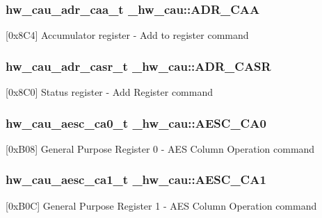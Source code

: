 \subsubsection[{\texorpdfstring{A\+D\+R\+\_\+\+C\+AA}{ADR_CAA}}]{ {\bf hw\+\_\+cau\+\_\+adr\+\_\+caa\+\_\+t} \+\_\+hw\+\_\+cau\+::\+A\+D\+R\+\_\+\+C\+AA}\hypertarget{struct__hw__cau_ad7cd403cbd4fd316a355c388cba84c43}{}\label{struct__hw__cau_ad7cd403cbd4fd316a355c388cba84c43}
\mbox{[}0x8\+C4\mbox{]} Accumulator register -\/ Add to register command 
\subsubsection[{\texorpdfstring{A\+D\+R\+\_\+\+C\+A\+SR}{ADR_CASR}}]{ {\bf hw\+\_\+cau\+\_\+adr\+\_\+casr\+\_\+t} \+\_\+hw\+\_\+cau\+::\+A\+D\+R\+\_\+\+C\+A\+SR}\hypertarget{struct__hw__cau_afc95808d62c7bfecc0e239c5c82dfb86}{}\label{struct__hw__cau_afc95808d62c7bfecc0e239c5c82dfb86}
\mbox{[}0x8\+C0\mbox{]} Status register -\/ Add Register command 
\subsubsection[{\texorpdfstring{A\+E\+S\+C\+\_\+\+C\+A0}{AESC_CA0}}]{ {\bf hw\+\_\+cau\+\_\+aesc\+\_\+ca0\+\_\+t} \+\_\+hw\+\_\+cau\+::\+A\+E\+S\+C\+\_\+\+C\+A0}\hypertarget{struct__hw__cau_af13ff7ad2c8c9054b08d05363509a18a}{}\label{struct__hw__cau_af13ff7ad2c8c9054b08d05363509a18a}
\mbox{[}0x\+B08\mbox{]} General Purpose Register 0 -\/ A\+ES Column Operation command 
\subsubsection[{\texorpdfstring{A\+E\+S\+C\+\_\+\+C\+A1}{AESC_CA1}}]{ {\bf hw\+\_\+cau\+\_\+aesc\+\_\+ca1\+\_\+t} \+\_\+hw\+\_\+cau\+::\+A\+E\+S\+C\+\_\+\+C\+A1}\hypertarget{struct__hw__cau_ae866509dcaf0f1a3eac11a921b2fe035}{}\label{struct__hw__cau_ae866509dcaf0f1a3eac11a921b2fe035}
\mbox{[}0x\+B0C\mbox{]} General Purpose Register 1 -\/ A\+ES Column Operation command 

